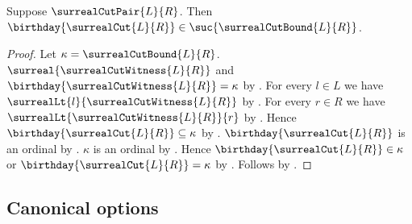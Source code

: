 \begin{corollary}\label{surreal_cut_pair_birthday_bound}
    Suppose $\surrealCutPair{L}{R}$.
    Then $\birthday{\surrealCut{L}{R}}\in
        \suc{\surrealCutBound{L}{R}}$.
\end{corollary}
\begin{proof}
    Let $\kappa=\surrealCutBound{L}{R}$.
    $\surreal{\surrealCutWitness{L}{R}}$ and
        $\birthday{\surrealCutWitness{L}{R}}=\kappa$
        by .
    For every $l\in L$ we have
        $\surrealLt{l}{\surrealCutWitness{L}{R}}$
        by .
    For every $r\in R$ we have
        $\surrealLt{\surrealCutWitness{L}{R}}{r}$
        by .
    Hence $\birthday{\surrealCut{L}{R}}\subseteq\kappa$
        by .
    $\birthday{\surrealCut{L}{R}}$ is an ordinal
        by .
    $\kappa$ is an ordinal by .
    Hence $\birthday{\surrealCut{L}{R}}\in\kappa$ or
        $\birthday{\surrealCut{L}{R}}=\kappa$
        by .
    Follows by .
\end{proof}

\subsection{Canonical options}

